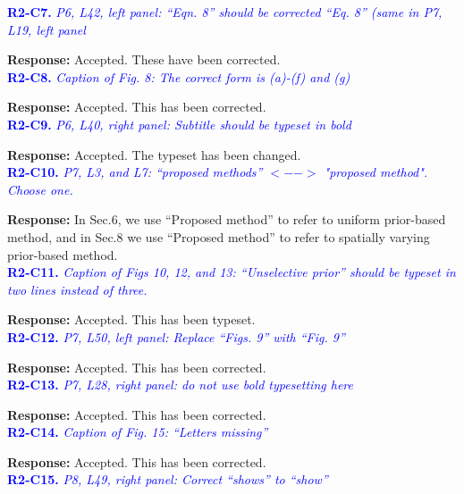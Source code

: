 \documentclass{article}
\begin{document}
\textcolor{blue}{\textbf{R2-C7.}\textit{ P6, L42, left panel: ``Eqn. 8'' should be corrected ``Eq. 8'' (same in P7, L19, left panel}}

  \textbf{Response:} Accepted. These have been corrected.\\
 
 \textcolor{blue}{\textbf{R2-C8.}\textit{ Caption of Fig. 8: The correct form is (a)-(f) and (g)}}

  \textbf{Response:} Accepted. This has been corrected.\\
 
 \textcolor{blue}{\textbf{R2-C9.}\textit{ P6, L40, right panel: Subtitle should be typeset in bold}}
 
  \textbf{Response:} Accepted. The typeset has been changed.\\

 \textcolor{blue}{\textbf{R2-C10.}\textit{ P7, L3, and L7: ``proposed methods'' $<-->$ "proposed method". Choose one.}}
 
 \textbf{Response:} In Sec.6, we use ``Proposed method'' to refer to uniform prior-based method, and in Sec.8 we use ``Proposed method'' to refer to spatially varying prior-based method.\\

\textcolor{blue}{\textbf{R2-C11.}\textit{ Caption of Figs 10, 12, and 13: ``Unselective prior'' should be typeset in two lines instead of three.}}

  \textbf{Response:} Accepted. This has been typeset.\\

 \textcolor{blue}{\textbf{R2-C12.}\textit{ P7, L50, left panel: Replace ``Figs. 9'' with ``Fig. 9''}}
 
  \textbf{Response:} Accepted. This has been corrected.\\
 
 \textcolor{blue}{\textbf{R2-C13.}\textit{ P7, L28, right panel: do not use bold typesetting here}}
 
  \textbf{Response:} Accepted. This has been corrected.\\

 \textcolor{blue}{\textbf{R2-C14.}\textit{ Caption of Fig. 15: ``Letters missing''}}
 
  \textbf{Response:} Accepted. This has been corrected.\\

 \textcolor{blue}{\textbf{R2-C15.}\textit{ P8, L49, right panel: Correct ``shows'' to ``show''}}
 
\end{document}
